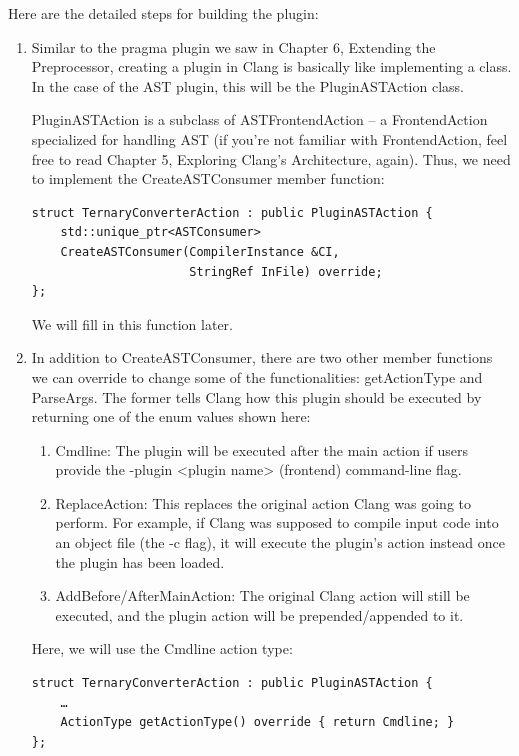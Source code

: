Here are the detailed steps for building the plugin:

\begin{enumerate}
\item Similar to the pragma plugin we saw in Chapter 6, Extending the Preprocessor, creating a plugin in Clang is basically like implementing a class. In the case of the AST plugin, this will be the PluginASTAction class.

PluginASTAction is a subclass of ASTFrontendAction – a FrontendAction specialized for handling AST (if you're not familiar with FrontendAction, feel free to read Chapter 5, Exploring Clang's Architecture, again). Thus, we need to implement the CreateASTConsumer member function:
\begin{lstlisting}[style=styleCXX]
struct TernaryConverterAction : public PluginASTAction {
	std::unique_ptr<ASTConsumer>
	CreateASTConsumer(CompilerInstance &CI,
                      StringRef InFile) override;
};
\end{lstlisting}
We will fill in this function later.


\item In addition to CreateASTConsumer, there are two other member functions we can override to change some of the functionalities: getActionType and ParseArgs. The former tells Clang how this plugin should be executed by returning one of the enum values shown here:

\begin{enumerate}[label=\alph*.]
\item Cmdline: The plugin will be executed after the main action if users provide the -plugin <plugin name> (frontend) command-line flag.

\item ReplaceAction: This replaces the original action Clang was going to perform. For example, if Clang was supposed to compile input code into an object file (the -c flag), it will execute the plugin's action instead once the plugin has been loaded.

\item AddBefore/AfterMainAction: The original Clang action will still be executed, and the plugin action will be prepended/appended to it.
\end{enumerate}

Here, we will use the Cmdline action type:

\begin{lstlisting}[style=styleCXX]
struct TernaryConverterAction : public PluginASTAction {
	…
	ActionType getActionType() override { return Cmdline; }
};
\end{lstlisting}


\end{enumerate}
